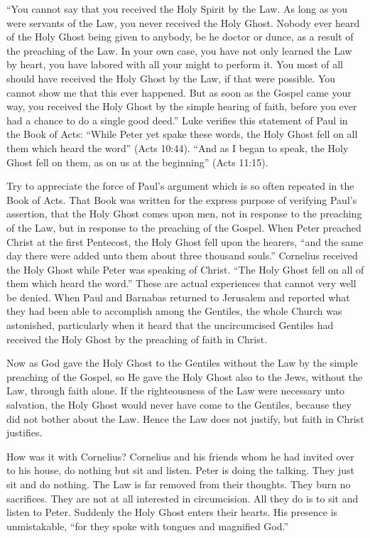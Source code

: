 “You cannot say that you received the Holy Spirit by the Law. As long as you were servants of the Law, you never received the Holy Ghost. Nobody ever heard of the Holy Ghost being given to anybody, be he doctor or dunce, as a result of the preaching of the Law. In your own case, you have not only learned the Law by heart, you have labored with all your might to perform it. You most of all should have received the Holy Ghost by the Law, if that were possible. You cannot show me that this ever happened. But as soon as the Gospel came your way, you received the Holy Ghost by the simple hearing of faith, before you ever had a chance to do a single good deed.” Luke verifies this statement of Paul in the Book of Acts: “While Peter yet spake these words, the Holy Ghost fell on all them which heard the word” (Acts 10:44). “And as I began to speak, the Holy Ghost fell on them, as on us at the beginning” (Acts 11:15).

Try to appreciate the force of Paul’s argument which is so often repeated in the Book of Acts. That Book was written for the express purpose of verifying Paul’s assertion, that the Holy Ghost comes upon men, not in response to the preaching of the Law, but in response to the preaching of the Gospel. When Peter preached Christ at the first Pentecost, the Holy Ghost fell upon the hearers, “and the same day there were added unto them about three thousand souls.” Cornelius received the Holy Ghost while Peter was speaking of Christ. “The Holy Ghost fell on all of them which heard the word.” These are actual experiences that cannot very well be denied. When Paul and Barnabas returned to Jerusalem and reported what they had been able to accomplish among the Gentiles, the whole Church was astonished, particularly when it heard that the uncircumcised Gentiles had received the Holy Ghost by the preaching of faith in Christ.

Now as God gave the Holy Ghost to the Gentiles without the Law by the simple preaching of the Gospel, so He gave the Holy Ghost also to the Jews, without the Law, through faith alone. If the righteousness of the Law were necessary unto salvation, the Holy Ghost would never have come to the Gentiles, because they did not bother about the Law. Hence the Law does not justify, but faith in Christ justifies.

How was it with Cornelius? Cornelius and his friends whom he had invited over to his house, do nothing but sit and listen. Peter is doing the talking. They just sit and do nothing. The Law is far removed from their thoughts. They burn no sacrifices. They are not at all interested in circumcision. All they do is to sit and listen to Peter. Suddenly the Holy Ghost enters their hearts. His presence is unmistakable, “for they spoke with tongues and magnified God.”

